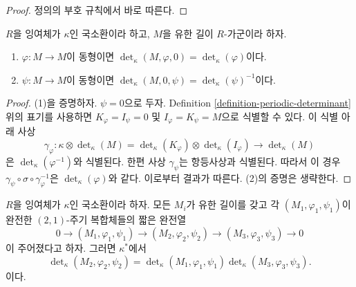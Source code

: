 \begin{proof}
정의의 부호 규칙에서 바로 따른다.
\end{proof}

\begin{lemma}
\label{lemma-periodic-determinant-easy-case}
$R$을 잉여체가 $\kappa$인 국소환이라 하고, $M$을 유한 길이
$R$-가군이라 하자.
\begin{enumerate}
\item $\varphi : M \to M$이 동형이면
$\det_\kappa(M, \varphi, 0) = \det_\kappa(\varphi)$이다.
\item $\psi : M \to M$이 동형이면
$\det_\kappa(M, 0, \psi) = \det_\kappa(\psi)^{-1}$이다.
\end{enumerate}
\end{lemma}

\begin{proof}
(1)을 증명하자. $\psi = 0$으로 두자. Definition
\ref{definition-periodic-determinant} 위의 표기를 사용하면
$K_\varphi = I_\psi = 0$ 및 $I_\varphi = K_\psi = M$으로 식별할 수
있다. 이 식별 아래 사상
$$
\gamma_\varphi :
\kappa \otimes \det\nolimits_\kappa(M)
=
\det\nolimits_\kappa(K_\varphi)
\otimes
\det\nolimits_\kappa(I_\varphi)
\longrightarrow
\det\nolimits_\kappa(M)
$$
은 $\det_\kappa(\varphi^{-1})$와 식별된다. 한편 사상 $\gamma_\psi$는
항등사상과 식별된다. 따라서 이 경우
$\gamma_\psi \circ \sigma \circ \gamma_\varphi^{-1}$은
$\det_\kappa(\varphi)$와 같다. 이로부터 결과가 따른다. (2)의 증명은
생략한다.
\end{proof}

\begin{lemma}
\label{lemma-periodic-determinant}
$R$을 잉여체가 $\kappa$인 국소환이라 하자. 모든 $M_i$가 유한 길이를
갖고 각 $(M_1, \varphi_1, \psi_1)$이 완전한 $(2, 1)$-주기 복합체들의
짧은 완전열
$$
0 \to (M_1, \varphi_1, \psi_1)
\to (M_2, \varphi_2, \psi_2)
\to (M_3, \varphi_3, \psi_3)
\to 0
$$
이 주어졌다고 하자. 그러면 $\kappa^*$에서
$$
\det\nolimits_\kappa(M_2, \varphi_2, \psi_2) =
\det\nolimits_\kappa(M_1, \varphi_1, \psi_1)
\det\nolimits_\kappa(M_3, \varphi_3, \psi_3).
$$
이다.
\end{lemma}

